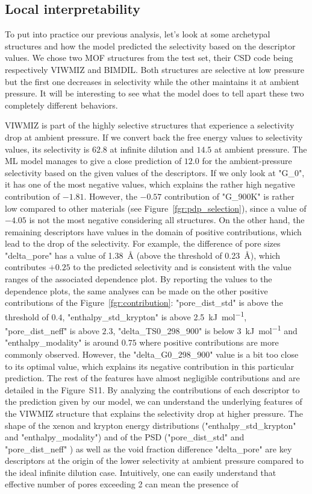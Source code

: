 \documentclass[main]{subfiles}
\begin{document}
\subsection{Local interpretability}

To put into practice our previous analysis, let's look at some archetypal structures and how the model predicted the selectivity based on the descriptor values. We chose two MOF structures from the test set, their CSD code being respectively VIWMIZ and BIMDIL. Both structures are selective at low pressure but the first one decreases in selectivity while the other maintains it at ambient pressure. It will be interesting to see what the model does to tell apart these two completely different behaviors.

VIWMIZ is part of the highly selective structures that experience a selectivity drop at ambient pressure. If we convert back the free energy values to selectivity values, its selectivity is $62.8$ at infinite dilution and $14.5$ at ambient pressure. The ML model manages to give a close prediction of $12.0$ for the ambient-pressure selectivity based on the given values of the descriptors. If we only look at "G\_0", it has one of the most negative values, which explains the rather high negative contribution of $-1.81$. However, the $-0.57$ contribution of "G\_900K" is rather low compared to other materials (see Figure~\ref{fgr:pdp_selection}), since a value of $-4.05$ is not the most negative considering all structures. On the other hand, the remaining descriptors have values in the domain of positive contributions, which lead to the drop of the selectivity. For example, the difference of pore sizes "delta\_pore" has a value of \SI{1.38}{\angstrom} (above the threshold of \SI{0.23}{\angstrom}), which contributes $+0.25$ to the predicted selectivity and is consistent with the value ranges of the associated dependence plot. By reporting the values to the dependence plots, the same analyses can be made on the other positive contributions of the Figure~\ref{fgr:contribution}: "pore\_dist\_std" is above the threshold of $0.4$, "enthalpy\_std\_krypton" is above \SI{2.5}{\kilo\joule\per\mole}, "pore\_dist\_neff" is above $2.3$, "delta\_TS0\_298\_900" is below \SI{3}{\kilo\joule\per\mole} and "enthalpy\_modality" is around $0.75$ where positive contributions are more commonly observed. However, the "delta\_G0\_298\_900" value is a bit too close to its optimal value, which explains its negative contribution in this particular prediction. The rest of the features have almost negligible contributions and are detailed in the Figure~S11. By analyzing the contributions of each descriptor to the prediction given by our model, we can understand the underlying features of the VIWMIZ structure that explains the selectivity drop at higher pressure. The shape of the xenon and krypton energy distributions ("enthalpy\_std\_krypton" and "enthalpy\_modality") and of the PSD ("pore\_dist\_std" and "pore\_dist\_neff" ) as well as the void fraction difference "delta\_pore" are key descriptors at the origin of the lower selectivity at ambient pressure compared to the ideal infinite dilution case. Intuitively, one can easily understand that effective number of pores exceeding 2 can mean the presence of 
\end{document}
